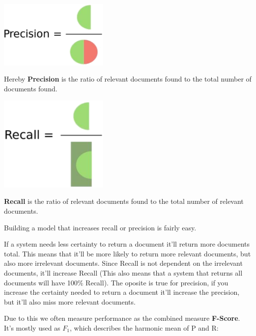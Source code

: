 \documentclass[
../../NLP4W_Summary.tex,
]
{subfiles}
\begin{document}
\begin{minipage}
    [t]{0.45\textwidth}
    \begin{center}
        \includegraphics[width=0.4\textwidth]{Pics/Precision.png}
    \end{center}

    Hereby \textbf{Precision} is the ratio of relevant documents found to the total number of documents found.
\end{minipage}
\hfill
\begin{minipage}
    [t]{0.45\textwidth}
    \begin{center}
        \includegraphics[width=0.4\textwidth]{Pics/Recall.png} 
    \end{center}
    
    \textbf{Recall} is the ratio of relevant documents found to the total number of relevant documents.
\end{minipage}
\vspace{10pt}

Building a model that increases recall or precision is fairly easy. 

If a system needs less certainty to return a document it'll return more documents total. This means that it'll be more likely to return more relevant documents, but also more irrelevant documents. Since Recall is not dependent on the irrelevant documents, it'll increase Recall (This also means that a system that returns all documents will have 100\% Recall). The oposite is true for precision, if you increase the certainty needed to return a document it'll increase the precision, but it'll also miss more relevant documents.

\newpage
Due to this we often measure performance as the combined measure \textbf{F-Score}.
It's mostly used as $F_1$, which describes the harmonic mean of P and R: 
\end{document}
